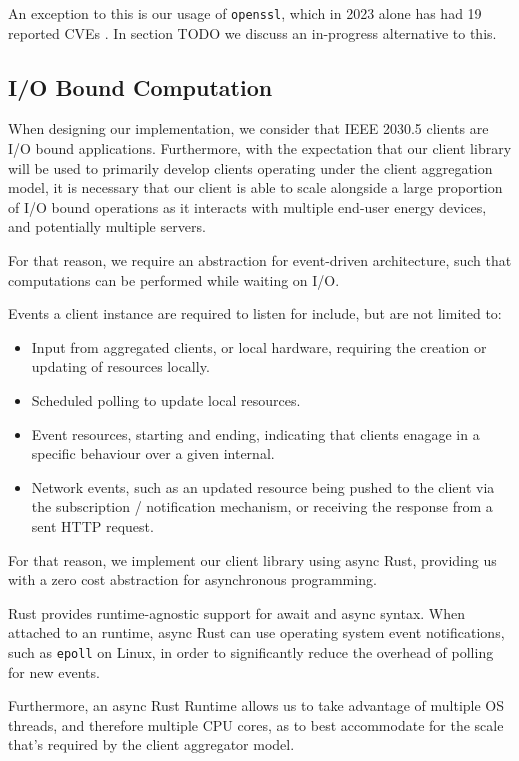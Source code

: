 An exception to this is our usage of \texttt{openssl}, which in 2023 alone has had 19 reported CVEs \cite{OpensslCVE}. In section TODO we discuss an in-progress alternative to this.

\subsection{I/O Bound Computation}
When designing our implementation, we consider that IEEE 2030.5 clients are I/O bound applications. Furthermore, with the expectation that our client library will be used to primarily develop clients operating under the client aggregation model, it is necessary that our client is able to scale alongside a large proportion of I/O bound operations as it interacts with multiple end-user energy devices, and potentially multiple servers.

For that reason, we require an abstraction for event-driven architecture, such that computations can be performed while waiting on I/O.

Events a client instance are required to listen for include, but are not limited to:

\begin{itemize}
    \item Input from aggregated clients, or local hardware, requiring the creation or updating of resources locally.
    \item Scheduled polling to update local resources.
    \item Event resources, starting and ending, indicating that clients enagage in a specific behaviour over a given internal.
    \item Network events, such as an updated resource being pushed to the client via the subscription / notification mechanism, or receiving the response from a sent HTTP request.
\end{itemize}

For that reason, we implement our client library using async Rust, providing us with a zero cost abstraction for asynchronous programming.

Rust provides runtime-agnostic support for await and async syntax.
When attached to an runtime, async Rust can use operating system event notifications, such as \texttt{epoll} on Linux, in order to significantly reduce the overhead of polling for new events.

Furthermore, an async Rust Runtime allows us to take advantage of multiple OS threads, and therefore multiple CPU cores, as to best accommodate for the scale that's required by the client aggregator model.

